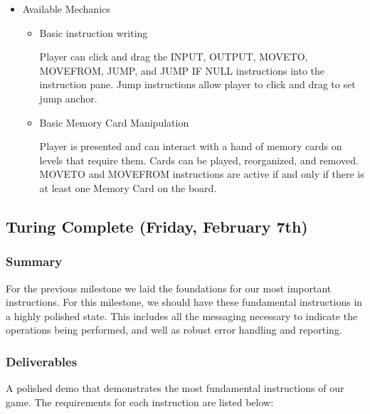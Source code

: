 \begin{itemize}
  \item Available Mechanics
  \begin{itemize}
    \item Basic instruction writing
    
    Player can click and drag the INPUT, OUTPUT, MOVETO, MOVEFROM, JUMP, and JUMP IF NULL instructions into the instruction pane. Jump instructions allow player to click and drag to set jump anchor.

    \item Basic Memory Card Manipulation
    
    Player is presented and can interact with a hand of memory cards on levels that require them. Cards can be played, reorganized, and removed. MOVETO and MOVEFROM instructions are active if and only if there is at least one Memory Card on the board.

  \end{itemize}
\end{itemize}

\subsection{Turing Complete (Friday, February 7th)}

\subsubsection*{Summary}
For the previous milestone we laid the foundations for our most important
instructions. For this milestone, we should have these fundamental instructions
in a highly polished state. This includes all the messaging necessary to
indicate the operations being performed, and well as robust error handling and
reporting.

\subsubsection*{Deliverables}
A polished demo that demonstrates the most fundamental instructions of our game.
The requirements for each instruction are listed below:

